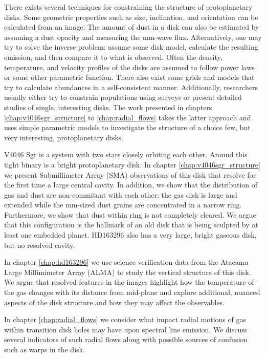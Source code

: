 There exists several techniques for constraining the structure of protoplanetary disks.  Some geometric 
properties such as size, inclination, and orientation can be calculated from an image.  The amount of dust 
in a disk can also be estimated by assuming a dust opacity and measuring the mm-wave flux.  Alternatively, one 
may try to solve the inverse problem: assume some disk model, calculate the resulting emission, and then compare
it to what is observed.  Often the density, temperature, and velocity profiles of the disks are assumed to 
follow power laws or some other parametric function.  There also exist some grids and models that try to 
calculate abundances in a self-consistent manner.  Additionally, researchers usually either try to constrain 
populations using 
surveys \citep[i.e.][]{andrews11,oberg11,harris12} or present detailed studies of single, 
interesting disks.  The work
presented in chapters \ref{chap:v4046sgr_structure} to \ref{chap:radial_flows} takes the latter approach and uses simple parametric 
models to investigate the structure of a choice few, but very interesting, protoplanetary disks.

V4046 Sgr is a system with two stars closely orbiting each other.  Around this tight binary is a bright
protoplanetary disk.  In chapter \ref{chap:v4046sgr_structure} we present Submillimeter Array (SMA) observations of this 
disk 
that resolve for the
first time a large central cavity.  In addition, we show that the distribution of gas and dust are non-commitant 
with each other: the gas disk is large and extended while the mm-sized dust grains are concentrated in a narrow 
ring.  Furthermore, we show that dust within ring is not completely cleared.  We argue that this configuration is 
the hallmark of an old disk that is being sculpted by at least one embedded planet.  HD163296 also has a 
very large, bright gaseous disk, but no resolved cavity.  

In chapter \ref{chap:hd163296} we 
use 
science verification data from the Atacama Large Millimimeter Array (ALMA) to study the vertical structure of 
this disk.  We argue that resolved features in the images highlight how the temperature of the gas changes with
its distance from mid-plane and explore additional, nuanced aspects of the disk structure and how they may 
affect the observables.   

In chapter \ref{chap:radial_flows} we consider what impact radial motions of gas within transition disk 
holes may have upon spectral line emission.  We discuss several indicators of such radial flows along 
with possible sources of confusion such as warps in the disk.

